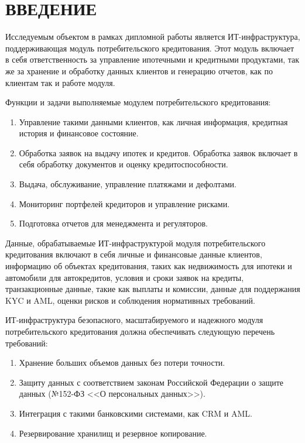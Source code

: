 \documentclass[14pt, a4paper]{extarticle}
\begin{document}
\def\contentsname{СОДЕРЖАНИЕ}

\begin{titlepage}
  
  
\end{titlepage}
\setcounter{page}{7}
\tableofcontents

\section*{ВВЕДЕНИЕ}
{}

Исследуемым объектом в рамках дипломной работы является ИТ-инфраструктура,
поддерживающая модуль потребительского кредитования. Этот модуль включает в
себя ответственность за управление ипотечными и кредитными продуктами, так же
за хранение и обработку данных клиентов и генерацию отчетов, как по клиентам
так и работе модуля.

Функции и задачи выполняемые модулем потребительского кредитования:
\begin{enumerate}
	\item Управление такими данными клиентов, как личная информация, кредитная
история и финансовое состояние.
	\item Обработка заявок на выдачу ипотек и кредитов. Обработка заявок включает
в себя обработку документов и оценку кредитоспособности.
	\item Выдача, обслуживание, управление платяжами и дефолтами.
	\item Мониторинг портфелей кредиторов и управление рисками.
	\item Подготовка отчетов для менеджмента и регуляторов.
\end{enumerate}

Данные, обрабатываемые ИТ-инфраструктурой модуля потребительского кредитования
включают в себя личные и финансовые данные клиентов, информацию об объектах
кредитования, таких как недвижимость для ипотеки и автомобили для автокредитов,
условия и сроки заявок на кредиты, транзакционные данные, такие как выплаты и
комиссии, данные для поддержания KYC и AML, оценки рисков и соблюдения
нормативных требований.

ИТ-инфраструктура безопасного, масштабируемого и надежного модуля
потребительского кредитования должна обеспечивать следующую перечень
требований:

\begin{enumerate}
	\item Хранение больших объемов данных без потери точности.
	\item Защиту данных с соответствием законам Российской Федерации о защите
данных (№152-ФЗ <<О персональных данных>>).
	\item Интеграция с такими банковскими системами, как CRM и AML.
	\item Резервирование хранилищ и резервное копирование.
\end{enumerate}
\end{document}

